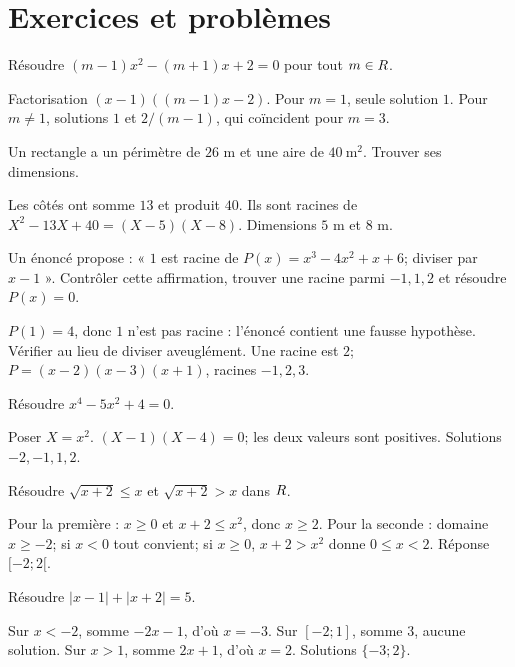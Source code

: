 \section{Exercices et problèmes}
\label{t11s-c08-e01}
Résoudre $(m-1)x^2-(m+1)x+2=0$ pour tout $m\in R$.
\begin{corrige}\label{sol-t11s-c08-e01}
Factorisation $(x-1)((m-1)x-2)$. Pour $m=1$, seule solution $1$. Pour $m\ne1$, solutions $1$ et $2/(m-1)$, qui coïncident pour $m=3$.
\end{corrige}
\label{t11s-c08-e02}
Un rectangle a un périmètre de $26$ m et une aire de $40\ \mathrm{m}^2$. Trouver ses dimensions.
\begin{corrige}\label{sol-t11s-c08-e02}
Les côtés ont somme $13$ et produit $40$. Ils sont racines de $X^2-13X+40=(X-5)(X-8)$. Dimensions $5$ m et $8$ m.
\end{corrige}
\exo[Cubique]\label{t11s-c08-e03}
Un énoncé propose : « $1$ est racine de $P(x)=x^3-4x^2+x+6$; diviser par $x-1$ ». Contrôler cette affirmation, trouver une racine parmi $-1,1,2$ et résoudre $P(x)=0$.
\begin{corrige}\label{sol-t11s-c08-e03}
$P(1)=4$, donc $1$ n’est pas racine : l’énoncé contient une fausse hypothèse. Vérifier au lieu de diviser aveuglément. Une racine est $2$; $P=(x-2)(x-3)(x+1)$, racines $-1,2,3$.
\end{corrige}
\exo[Bicarrée]\label{t11s-c08-e04}
Résoudre $x^4-5x^2+4=0$.
\begin{corrige}\label{sol-t11s-c08-e04}
Poser $X=x^2$. $(X-1)(X-4)=0$; les deux valeurs sont positives. Solutions $-2,-1,1,2$.
\end{corrige}
\label{t11s-c08-e05}
Résoudre $\sqrt{x+2}\le x$ et $\sqrt{x+2}>x$ dans $R$.
\begin{corrige}\label{sol-t11s-c08-e05}
Pour la première : $x\ge0$ et $x+2\le x^2$, donc $x\ge2$. Pour la seconde : domaine $x\ge-2$; si $x<0$ tout convient; si $x\ge0$, $x+2>x^2$ donne $0\le x<2$. Réponse $[-2;2[$.
\end{corrige}
\label{t11s-c08-e06}
Résoudre $|x-1|+|x+2|=5$.
\begin{corrige}\label{sol-t11s-c08-e06}
Sur $x<-2$, somme $-2x-1$, d’où $x=-3$. Sur $[-2;1]$, somme $3$, aucune solution. Sur $x>1$, somme $2x+1$, d’où $x=2$. Solutions $\{-3;2\}$.
\end{corrige}
